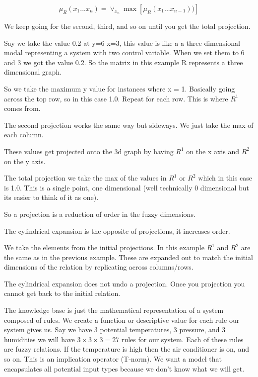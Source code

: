 \documentclass{article}
\begin{document}
\begin{equation}
	\mu_{R}(x_1 ... x_n) = \vee_{x_n} \max[\mu_{R}(x_1 ... x_{n-1}))]
\end{equation}

We keep going for the second, third, and so on until you get the total projection.



Say we take the value 0.2 at y=6 x=3, this value is like a a three dimensional modal representing a system with two control variable. When we set them to 6 and 3 we got the value 0.2. So the matrix in this example R represents a three dimensional graph.

So we take the maximum y value for instances where x = 1. Basically going across the top row, so in this case 1.0. Repeat for each row. This is where $R^1$ comes from.

The second projection works the same way but sideways. We just take the max of each column.

These values get projected onto the 3d graph by having $R^1$ on the x axis and $R^2$ on the y axis.

The total projection we take the max of the values in $R^1$ or $R^2$ which in this case is 1.0. This is a single point, one dimensional (well technically 0 dimensional but its easier to think of it as one).

So a projection is a reduction of order in the fuzzy dimensions.


The cylindrical expansion is the opposite of projections, it increases order.

We take the elements from the initial projections. In this example $R^1$ and $R^2$ are the same as in the previous example. These are expanded out to match the initial dimensions of the relation by replicating across columns/rows.

The cylindrical expansion does not undo a projection. Once you projection you cannot get back to the initial relation.



The knowledge base is just the mathematical representation of a system composed of rules. We create a function or descriptive value for each rule our system gives us. Say we have 3 potential temperatures, 3 pressure, and 3 humidities we will have $3 \times 3 \times 3 = 27$ rules for our system. Each of these rules are fuzzy relations. If the temperature is high then the air conditioner is on, and so on. This is an implication operator (T-norm). We want a model that encapsulates all potential input types because we don't know what we will get.
\end{document}
